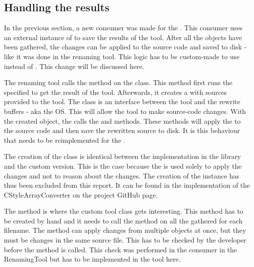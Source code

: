 \subsection{Handling the results}

In the previous section, a new consumer was made for the . This consumer uses an external instance of  to save the results of the tool. After all the  objects have been gathered, the changes can be applied to the source code and saved to disk - like it was done in the renaming tool. This logic has to be custom-made to use  instead of . This change will be discussed here.

The renaming tool calls the  method on the  class. This method first runs the specified  to get the result of the tool. Afterwards, it creates a  with sources provided to the tool. The  class is an interface between the tool and the rewrite buffers - aka the OS. This  will allow the tool to make source-code changes. With the created  object, the  calls the  and  methods. These methods will apply the  to the source code and then save the rewritten source to disk. It is this behaviour that needs to be reimplemented for the .

The creation of the  class is identical between the implementation in the library and the custom version. This is the case because the  is used solely to apply the changes and not to reason about the changes. The creation of the  instance has thus been excluded from this report. It can be found in the implementation of the CStyleArrayConverter on the project GitHub page. 

The  method is where the custom tool class gets interesting. This method has to be created by hand and it needs to call the  method on all the gathered  for each filename. The  method can apply changes from multiple  objects at once, but they must be changes in the same source file. This has to be checked by the developer before the method is called. This check was performed in the consumer in the RenamingTool but has to be implemented in the tool here. 

